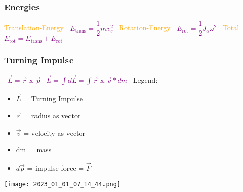 \documentclass[main.tex,fontsize=8pt,paper=a4,paper=portrait,DIV=calc,]{scrartcl}
\begin{document}
\begin{multicols*}{2}
\subsubsection{Energies}
\large \textcolor{orange}{Translation-Energy}\newline
\, \newline
\large \textcolor{purple}{\( E_{\text{trans}} = \dfrac{1}{2}mv^2_s \)}\newline
\, \newline
\large \textcolor{orange}{Rotation-Energy}\newline
\, \newline
\large \textcolor{purple}{\( E_{\text{rot}} = \dfrac{1}{2}J_s\omega^2 \)}
\, \newline
\large \textcolor{orange}{Total}\newline
\, \newline
\large \textcolor{purple}{\(E_{\text{tot}} = E_{\text{trans}} +  E_{\text{rot}}\)}
\normalsize

\subsubsection{Turning Impulse}
\, \newline
\large \textcolor{purple}{\( \vec{L} = \vec{r} \text{ x } \vec{p} \)}\newline
\, \newline
\large \textcolor{purple}{\( \vec{L} = \int{d\vec{L}} = \int{\vec{r} \text{ x } \vec{v} * dm} \)}\newline
\, \newline
\normalsize Legend: \newline
\begin{itemize}
  \item \(\vec{L}\) = Turning Impulse
  \item \(\vec{r}\) = radius as vector
  \item \(\vec{v}\) = velocity as vector 
\item dm = mass
\item \(d\vec{p}\) = impulse force = \(\vec{F}\)
\end{itemize} 
\texttt{[image: 2023\_01\_01\_07\_14\_44.png]}


\end{multicols*}
\end{document}
